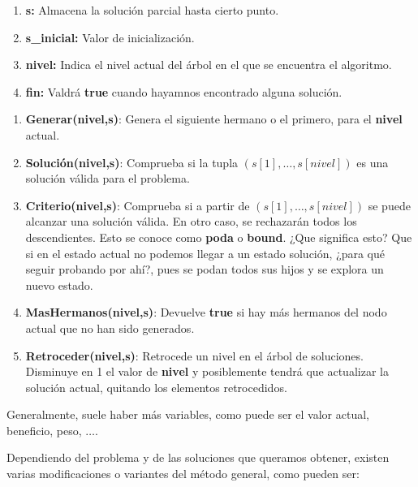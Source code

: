 \documentclass[10pt,a4paper,spanish]{report}
\theoremstyle{definition}
\theoremstyle{remark}
\begin{document}
\begin{description}
    \item [Variables:]
    \begin{enumerate}[---]
        \item \textbf{s:} Almacena la solución parcial hasta cierto punto.
        \item \textbf{s\_inicial:} Valor de inicialización.
        \item \textbf{nivel:} Indica el nivel actual del árbol en el que se encuentra el algoritmo.
        \item \textbf{fin:} Valdrá \textbf{true} cuando hayamnos encontrado alguna solución.
    \end{enumerate}
    \item [Funciones:]
    \begin{enumerate}[---]
        \item \textbf{Generar(nivel,s)}: Genera el siguiente hermano o el primero, para el \textbf{nivel} actual.
        \item \textbf{Solución(nivel,s)}: Comprueba si la tupla $(s[1],\ldots,s[nivel])$ es una solución válida para el problema.
        \item \textbf{Criterio(nivel,s)}: Comprueba si a partir de $(s[1],\ldots,s[nivel])$ se puede alcanzar una solución válida. En otro caso, se rechazarán todos los descendientes. Esto se conoce como \textbf{\textcolor{electricgreen}{poda}} o \textbf{\textcolor{electricgreen}{bound}}. ¿Que significa esto? Que si en el estado actual no podemos llegar a un estado solución, ¿para qué seguir probando por ahí?, pues se podan todos sus hijos y se explora un nuevo estado.
        \item \textbf{MasHermanos(nivel,s)}: Devuelve \textbf{true} si hay más hermanos del nodo actual que no han sido generados.
        \item \textbf{Retroceder(nivel,s)}: Retrocede un nivel en el árbol de soluciones. Disminuye en 1 el valor de \textbf{nivel} y posiblemente tendrá que actualizar la solución actual, quitando los elementos retrocedidos.
    \end{enumerate}

    \item Generalmente, suele haber más variables, como puede ser el valor actual, beneficio, peso, $\ldots$.

\end{description}

Dependiendo del problema y de las soluciones que queramos obtener, existen varias modificaciones o variantes del método general, como pueden ser:
\end{document}
